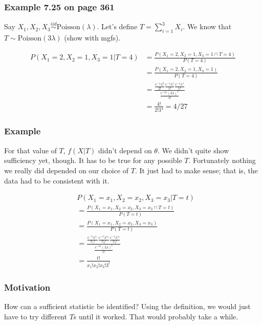 \documentclass{beamer}
\begin{document}
\begin{frame}
\frametitle{Example 7.25 on page 361}

Say $X_1, X_2, X_3 \overset{iid}{\sim} \text{Poisson}(\lambda)$. Let's define $T = \sum_{i=1}^3 X_i$. We know that $T \sim \text{Poisson}(3\lambda)$ (show with mgfs).

\begin{align*}
P(X_1 = 2, X_2 = 1, X_3 = 1 | T = 4) &= \frac{P(X_1 = 2, X_2 = 1, X_3 = 1 \cap T = 4)}{P(T = 4)} \\
&= \frac{P(X_1 = 2, X_2 = 1, X_3 = 1 )}{P(T = 4)} \\
&= \frac{ \frac{e^{-\lambda} \lambda^2 }{2!} \frac{e^{-\lambda} \lambda^1 }{1!}  \frac{e^{-\lambda} \lambda^1 }{1!}}{\frac{e^{-3\lambda} (3\lambda)^4 }{ 4! } }\\
&= \frac{4 ! }{2! 3^4} = 4/27
\end{align*}



\end{frame}


\begin{frame}
\frametitle{Example}

For that value of $T$, $f(X|T)$ didn't depend on $\theta$. We didn't quite show sufficiency yet, though. It has to be true for any possible $T$. Fortunately nothing we really did depended on our choice of $T$. It just had to make sense; that is, the data had to be consistent with it.

\begin{align*}
&P(X_1 = x_1, X_2 = x_2, X_3 = x_3 | T = t) \\
&= \frac{P(X_1 = x_1, X_2 = x_2, X_3 = x_3 \cap T = t)}{P(T = t)} \\
&= \frac{P(X_1 = x_1, X_2 = x_2, X_3 = x_3 )}{P(T = t)} \\
&= \frac{ \frac{e^{-\lambda} \lambda^{x_1} }{ x_1!} \frac{e^{-\lambda} \lambda^{x_2} }{ x_2!}  \frac{e^{-\lambda} \lambda^{x_3} }{ x_3!}}{\frac{e^{-3\lambda} (3\lambda)^t }{ t! } }\\
&= \frac{t!}{x_1! x_2! x_3! 3^t}
\end{align*}


\end{frame}


\begin{frame}
\frametitle{Motivation}

How can a sufficient statistic be identified? Using the definition, we would just have to try different $T$s until it worked. That would probably take a while. 

\end{frame}
\end{document}
